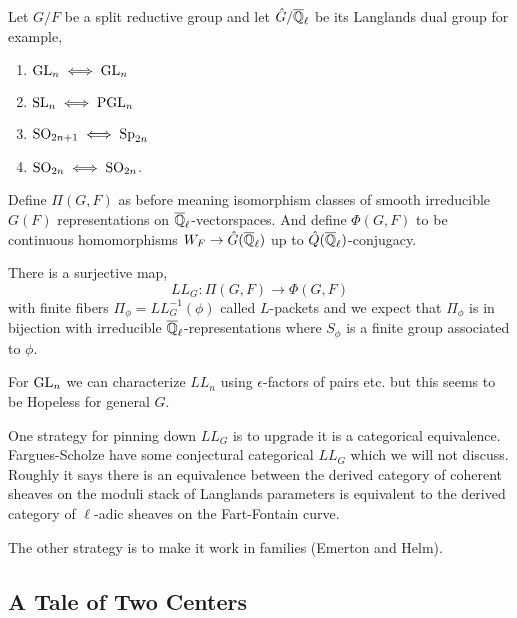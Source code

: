 \documentclass[12pt]{article}
\begin{document}
Let $G / F$ be a split reductive group and let $\hat{G} / \overline{\mathbb{Q}}_\ell$ be its Langlands dual group for example,
\begin{enumerate}
\item $\mathrm{GL}_n \iff \mathrm{GL}_n$
\item $\mathrm{SL}_n \iff \mathrm{PGL}_n$
\item $\mathrm{SO}_{2n+1} \iff \mathrm{Sp}_{2n}$
\item $\mathrm{SO}_{2n} \iff \mathrm{SO}_{2n}$.
\end{enumerate}

Define $\Pi(G, F)$ as before meaning isomorphism classes of smooth irreducible $G(F)$ representations on $\overline{\mathbb{Q}}_\ell$-vectorspaces. And define $\Phi(G, F)$ to be continuous homomorphisms $W_F \to \hat{G}(\overline{\mathbb{Q}}_\ell)$ up to $\hat{Q}(\overline{\mathbb{Q}}_\ell)$-conjugacy. 

\begin{conjecture}
There is a surjective map, 
\[ LL_G : \Pi(G, F) \to \Phi(G, F) \]
with finite fibers $\Pi_\phi = LL_G^{-1}(\phi)$ called $L$-packets and we expect that $\Pi_\phi$ is in bijection with irreducible $\overline{\mathbb{Q}}_\ell$-representations where $S_\phi$ is a finite group associated to $\phi$. 
\end{conjecture}

\begin{rmk}
For $\mathrm{GL}_n$ we can characterize $LL_n$ using $\epsilon$-factors of pairs etc. but this seems to be Hopeless for general $G$. 
\end{rmk}

\begin{rmk}
One strategy for pinning down $LL_G$ is to upgrade it is a categorical equivalence. Fargues-Scholze have some conjectural categorical $LL_G$ which we will not discuss. Roughly it says there is an equivalence between the derived category of coherent sheaves on the moduli stack of Langlands parameters is equivalent to the derived category of $\ell$-adic sheaves on the Fart-Fontain curve. 
\end{rmk}

\begin{rmk}
The other strategy is to make it work in families (Emerton and Helm).
\end{rmk}

\subsection{A Tale of Two Centers}

\newcommand{\cZ}{\mathcal{Z}}
\end{document}
